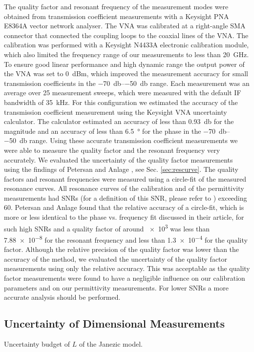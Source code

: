 The quality factor and resonant frequency of the measurement modes were obtained from transmission coefficient measurements with a Keysight PNA E8364A vector network analyser. The VNA was calibrated at a right-angle SMA connector that connected the coupling loops to the coaxial lines of the VNA. The calibration was performed with a Keysight N4433A electronic calibration module, which also limited the frequency range of our measurements to less than \SI{20}{\giga\hertz}. To ensure good linear performance and high dynamic range the output power of the VNA was set to \SI{0}{dBm}, which improved the measurement accuracy for small transmission coefficients in the \SIrange{-70}{-50}{\decibel} range. Each measurement was an average over 25 measurement sweeps, which were measured with the default IF bandwidth of \SI{35}{\kilo\hertz}. For this configuration we estimated the accuracy of the transmission coefficient measurement using the Keysight VNA uncertainty calculator. The calculator estimated an accuracy of less than \SI{0.93}{\decibel} for the magnitude and an accuracy of less than \SI{6.5}{\degree} for the phase in the \SIrange{-70}{-50}{\decibel} range. Using these accurate transmission coefficient measurements we were able to measure the quality factor and the resonant frequency very accurately. We evaluated the uncertainty of the quality factor measurements using the findings of Petersan and Anlage \cite{petersan}, see Sec. \ref{sec:rescurve}. The quality factors and resonant frequencies were measured using a circle-fit of the measured resonance curves. All resonance curves of the calibration and of the permittivity measurements had SNRs (for a definition of this SNR, please refer to \cite{petersan}) exceeding 60. Petersan and Anlage found that the relative accuracy of a circle-fit, which is more or less identical to the phase vs. frequency fit discussed in their article, for such high SNRs and a quality factor of around \num{e3} was less than \num{7.88e-8} for the resonant frequency and less than \num{1.3e-4} for the quality factor. Although the relative precision of the quality factor was lower than the accuracy of the method, we evaluated the uncertainty of the quality factor measurements using only the relative accuracy. This was acceptable as the quality factor measurements were found to have a negligible influence on our calibration parameters and on our permittivity measurements. For lower SNRs a more accurate analysis should be performed. 

\subsection{Uncertainty of Dimensional Measurements}
\begin{table}[ht]
\centering
\uncertl
{}
\caption{Uncertainty budget of $L$ of the Janezic model.}\label{u:L}
\end{table}

